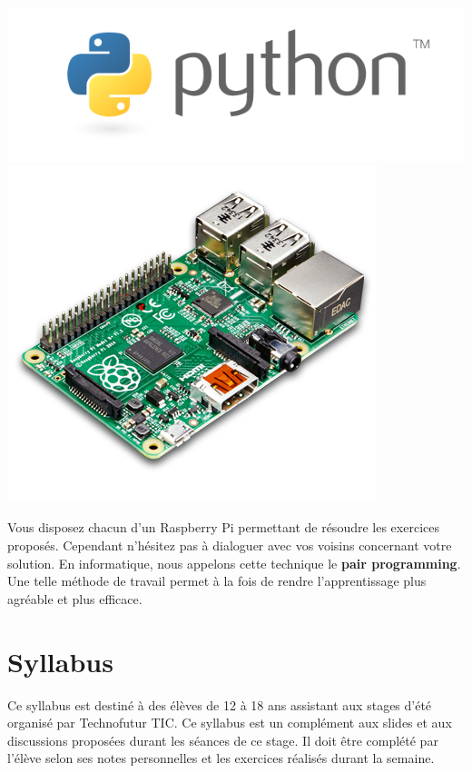 \documentclass[12pt,a4paper,oneside]{report}
\begin{document}
\begin{minipage}[r]{0.30\textwidth}
	\includegraphics[width=\textwidth]{Ressources/python.png}
	\bigskip
	\includegraphics[width=\textwidth]{Ressources/pi.png}
\end{minipage}

\bigskip
Vous disposez chacun d'un Raspberry Pi permettant de résoudre les exercices proposés. Cependant n'hésitez pas à dialoguer avec vos voisins concernant votre solution. En informatique, nous appelons cette
technique le \textbf{pair programming}. Une telle méthode de travail
permet à la fois de rendre l'apprentissage plus agréable et plus
efficace.

\section*{Syllabus}
Ce syllabus 
est destiné à des élèves de 12 à 18 ans assistant aux stages d'été organisé par Technofutur TIC. Ce syllabus est un complément aux slides et aux discussions proposées durant les séances de ce stage. Il doit être complété par l'élève selon ses notes personnelles et les exercices réalisés durant la semaine.
\end{document}
